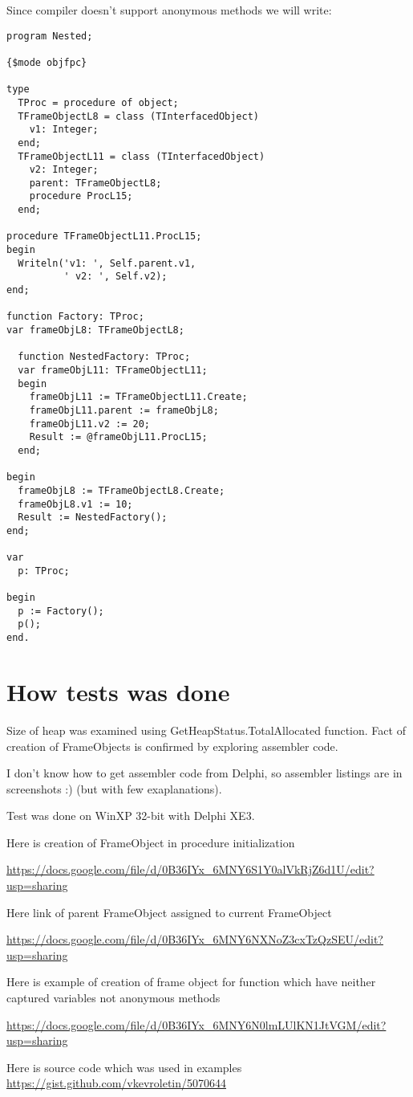 \documentclass[11pt]{article}
\begin{document}
Since compiler doesn't support anonymous methods we will write:


\begin{verbatim}
program Nested;

{$mode objfpc}

type
  TProc = procedure of object;
  TFrameObjectL8 = class (TInterfacedObject)
    v1: Integer;
  end;
  TFrameObjectL11 = class (TInterfacedObject)
    v2: Integer;
    parent: TFrameObjectL8;
    procedure ProcL15;
  end;

procedure TFrameObjectL11.ProcL15;
begin
  Writeln('v1: ', Self.parent.v1,
          ' v2: ', Self.v2);
end;

function Factory: TProc;
var frameObjL8: TFrameObjectL8;

  function NestedFactory: TProc;
  var frameObjL11: TFrameObjectL11;
  begin
    frameObjL11 := TFrameObjectL11.Create;
    frameObjL11.parent := frameObjL8;
    frameObjL11.v2 := 20;
    Result := @frameObjL11.ProcL15;
  end;

begin
  frameObjL8 := TFrameObjectL8.Create;
  frameObjL8.v1 := 10;
  Result := NestedFactory();
end;

var
  p: TProc;

begin
  p := Factory();
  p();
end.
\end{verbatim}
\section{How tests was done}
\label{sec-8}


Size of heap was examined using GetHeapStatus.TotalAllocated function.
Fact of creation of FrameObjects is confirmed by exploring assembler code.

I don't know how to get assembler code from Delphi, so assembler
listings are in screenshots :) (but with few exaplanations).

Test was done on WinXP 32-bit with Delphi XE3.

Here is creation of FrameObject in procedure initialization

\href{https://docs.google.com/file/d/0B36IYx_6MNY6S1Y0alVkRjZ6d1U/edit?usp=sharing}{https://docs.google.com/file/d/0B36IYx\_6MNY6S1Y0alVkRjZ6d1U/edit?usp=sharing}

Here link of parent FrameObject assigned to current FrameObject

\href{https://docs.google.com/file/d/0B36IYx_6MNY6NXNoZ3cxTzQzSEU/edit?usp=sharing}{https://docs.google.com/file/d/0B36IYx\_6MNY6NXNoZ3cxTzQzSEU/edit?usp=sharing}

Here is example of creation of frame object for function which have
neither captured variables not anonymous methods

\href{https://docs.google.com/file/d/0B36IYx_6MNY6N0lmLUlKN1JtVGM/edit?usp=sharing}{https://docs.google.com/file/d/0B36IYx\_6MNY6N0lmLUlKN1JtVGM/edit?usp=sharing}

Here is source code which was used in examples
\href{https://gist.github.com/vkevroletin/5070644}{https://gist.github.com/vkevroletin/5070644}
\end{document}
